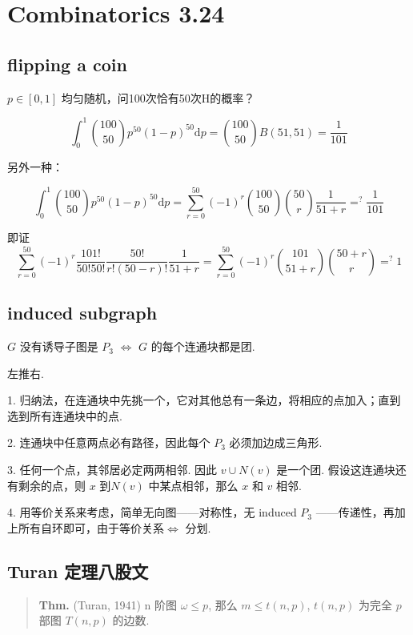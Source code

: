 \chapter{Combinatorics 3.24}
\label{ch:250324}

\section{flipping a coin}


$p\in[0,1]$ 均匀随机，问100次恰有50次H的概率？

\[
\int_0^1{100\choose50}p^{50}(1-p)^{50}\text{d} p={100\choose50}B(51,51)=\frac{1}{101}
\]

另外一种：

\[
\int_0^1{100\choose50}p^{50}(1-p)^{50}\text{d} p=\sum_{r=0}^{50}(-1)^r{100\choose50}{50\choose r}\frac{1}{51+r}=^?\frac{1}{101}
\]

即证
\[
\sum_{r=0}^{50}(-1)^r\frac{101!}{50!50!}\frac{50!}{r!(50-r)!}\frac{1}{51+r}=\sum_{r=0}^{50}(-1)^r{101\choose 51+r}{50+r\choose r}=^?1
\]

\section{induced subgraph}

$G$ 没有诱导子图是 $P_3$ $\iff$ $G$ 的每个连通块都是团.

左推右.

1. 归纳法，在连通块中先挑一个，它对其他总有一条边，将相应的点加入；直到选到所有连通块中的点.

2. 连通块中任意两点必有路径，因此每个 $P_3$ 必须加边成三角形.

3. 任何一个点，其邻居必定两两相邻. 因此 $v\cup N(v)$ 是一个团. 假设这连通块还有剩余的点，则 $x$ 到$N(v)$ 中某点相邻，那么 $x$ 和 $v$ 相邻.

4. 用等价关系来考虑，简单无向图——对称性，无 induced $P_3$ ——传递性，再加上所有自环即可，由于等价关系$\iff$ 分划.

\section{Turan 定理八股文}

\begin{quotation}
\textbf{Thm.} (Turan, 1941) n 阶图 $\omega\leq p$, 那么 $m\leq t(n,p)$, $t(n,p)$ 为完全 $p$ 部图 $T(n,p)$ 的边数.
\end{quotation}


